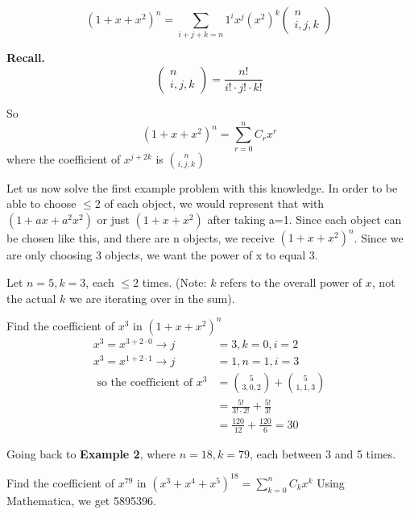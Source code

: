 $$
\left(1+x+x^{2}\right)^{n}=\sum_{i+j+k=n} 1^{i} x^{j}\left(x^{2}\right)^{k}\left(\begin{array}{c}
n \\
i, j, k
\end{array}\right)
$$

 \textbf{Recall.}
$$
\left(\begin{array}{c}
n \\
i, j, k
\end{array}\right)=\frac{n !}{i ! \cdot j ! \cdot k !}
$$

  So
$$
\left(1+x+x^{2}\right)^{n}=\sum_{r=0}^{n} C_{r} x^{r}
$$
where the coefficient of $x^{j+2 k}$ is $\binom n {i, j, k}$

Let us now solve the first example problem with this knowledge. In order to be able to choose $\leq 2$ of each object, we would represent that with $\left(1+a x+a^{2} x^{2}\right)$ or just $\left(1+x+x^{2}\right)$ after taking a=1. Since each object can be chosen like this, and there are n objects, we receive $\left(1+x+x^{2}\right)^{n}$. Since we are only choosing 3 objects, we want the power of x to equal 3.

\begin{example}{}
    Let $n=5, k=3$, each $\leq 2$ times. (Note: $k$ refers to the overall power of $x$, not the actual $k$ we are iterating over in the sum).
\end{example}
\begin{solution}
    Find the coefficient of $x^{3}$ in $\left(1+x+x^{2}\right)^{n}$
    $$
    \begin{aligned}
    x^{3}=x^{3+2 \cdot 0} \rightarrow j & =3, k=0, i=2 \\
    x^{3}=x^{1+2 \cdot 1} \rightarrow j & =1, n=1, i=3 \\
    \text { so the coefficient of } x^{3} & = \binom 5 {3,0,2}+ \binom 5 {1,1,3} \\
    & =\frac{5 !}{3 ! \cdot 2 !}+\frac{5 !}{3 !} \\
    & =\frac{120}{12}+\frac{120}{6}=\boxed{30}
    \end{aligned}
    $$
\end{solution}

Going back to \textbf{Example 2}, where $n=18, k=79$, each between 3 and 5 times.

\begin{solution}
    Find the coefficient of $x^{79}$ in $\left(x^{3}+x^{4}+x^{5}\right)^{18}=\sum_{k=0}^{n} C_{k} x^{k}$ Using Mathematica, we get 5895396.
\end{solution}

